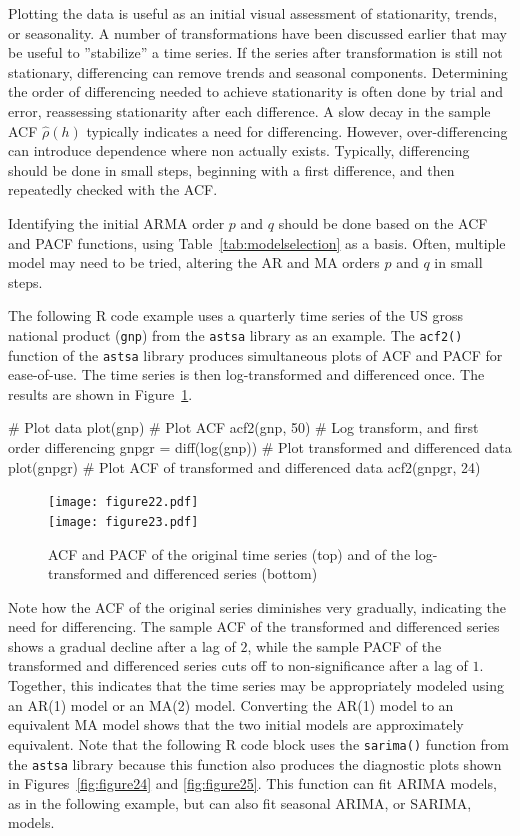 Plotting the data is useful as an initial visual assessment of stationarity, trends, or seasonality. A number of transformations have been discussed earlier that may be useful to ''stabilize'' a time series. If the series after transformation is still not stationary, differencing can remove trends and seasonal components. Determining the order of differencing needed to achieve stationarity is often done by trial and error, reassessing stationarity after each difference. A slow decay in the sample ACF $\hat\rho(h)$ typically indicates a need for differencing. However, over-differencing can introduce dependence where non actually exists. Typically, differencing should be done in small steps, beginning with a first difference, and then repeatedly checked with the ACF.

Identifying the initial ARMA order $p$ and $q$ should be done based on the ACF and PACF functions, using Table~\ref{tab:modelselection} as a basis. Often, multiple model may need to be tried, altering the AR and MA orders $p$ and $q$ in small steps. 

The following R code example uses a quarterly time series of the US gross national product (\texttt{gnp}) from the \texttt{astsa} library as an example. The \texttt{acf2()} function of the \texttt{astsa} library produces simultaneous plots of ACF and PACF for ease-of-use. The time series is then log-transformed and differenced once. The results are shown in Figure~\ref{fig:figure22}.

\begin{samepage}
\begin{Rcode}
# Plot data
plot(gnp)
# Plot ACF
acf2(gnp, 50)
# Log transform, and first order differencing
gnpgr = diff(log(gnp))
# Plot transformed and differenced data
plot(gnpgr)
# Plot ACF of transformed and differenced data
acf2(gnpgr, 24)
\end{Rcode}
\end{samepage}

\begin{figure}
\centering
\texttt{[image: figure22.pdf]} \\
\texttt{[image: figure23.pdf]}
\caption[ACF and PACF after transformations]{ACF and PACF of the original time series (top) and of the log-transformed and differenced series (bottom)}
\label{fig:figure22}
\end{figure}

Note how the ACF of the original series diminishes very gradually, indicating the need for differencing. The sample ACF of the transformed and differenced series shows a gradual decline after a lag of $2$, while the sample PACF of the transformed and differenced series cuts off to non-significance after a lag of $1$. Together, this indicates that the time series may be appropriately modeled using an AR(1) model or an MA(2) model. Converting the AR(1) model to an equivalent MA model shows that the two initial models are approximately equivalent. Note that the following R code block uses the \texttt{sarima()} function from the \texttt{astsa} library because this function also produces the diagnostic plots shown in Figures~\ref{fig:figure24} and \ref{fig:figure25}. This function can fit ARIMA models, as in the following example, but can also fit seasonal ARIMA, or SARIMA, models.

